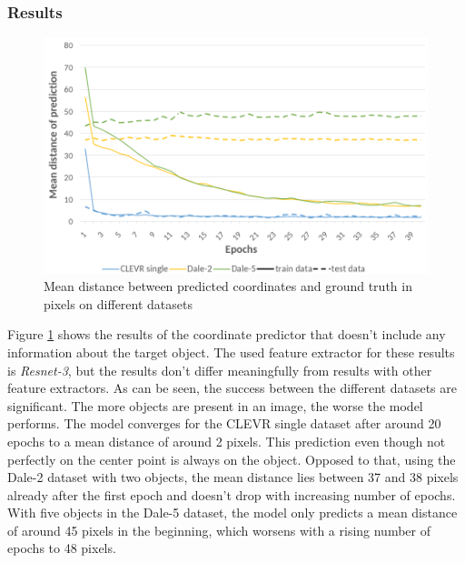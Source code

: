 \subsubsection*{Results}

\begin{figure}[ht]
    \centering
    \includegraphics[width=0.8\linewidth]{figures/coordinate-predictor_loss.png}
    \caption{Mean distance between predicted coordinates and ground truth in pixels on different datasets}
    \label{fig:coordinate-predictor_loss}
\end{figure}

Figure \ref{fig:coordinate-predictor_loss} shows the results of the coordinate predictor that doesn't include any information about the target object.
The used feature extractor for these results is \emph{Resnet-3}, but the results don't differ meaningfully from results with other feature extractors.
As can be seen, the success between the different datasets are significant.
The more objects are present in an image, the worse the model performs.
The model converges for the CLEVR single dataset after around 20 epochs to a mean distance of around 2 pixels.
This prediction even though not perfectly on the center point is always on the object.
Opposed to that, using the Dale-2 dataset with two objects, the mean distance lies between 37 and 38 pixels already after the first epoch and doesn't drop with increasing number of epochs.
With five objects in the Dale-5 dataset, the model only predicts a mean distance of around 45 pixels in the beginning, which worsens with a rising number of epochs to 48 pixels.

